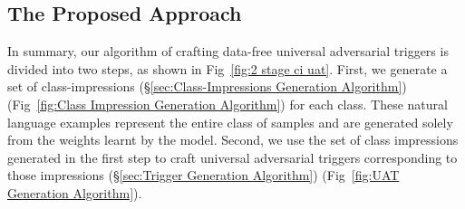 

\subsection{The Proposed Approach}
\label{sec:proposed approach}
In summary, our algorithm of crafting data-free universal adversarial triggers is divided into two steps, as shown in Fig~\ref{fig:2 stage ci uat}. First, we generate a set of class-impressions (\S\ref{sec:Class-Impressions Generation Algorithm}) (Fig~\ref{fig:Class Impression Generation Algorithm}) for each class. These natural language examples represent the entire class of samples and are generated solely from the weights learnt by the model. Second, we use the set of class impressions generated in the first step to craft universal adversarial triggers corresponding to those impressions (\S\ref{sec:Trigger Generation Algorithm}) (Fig~\ref{fig:UAT Generation Algorithm}).%


